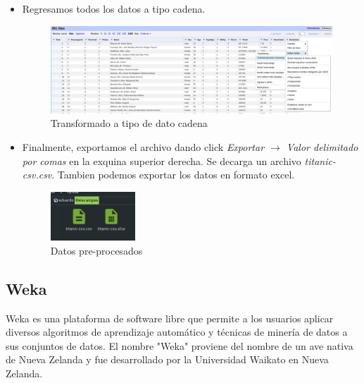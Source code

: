 \documentclass[12pt]{article}
\begin{document}
\begin{itemize}
                    \newpage
                    \item Regresamos todos los datos a tipo cadena.
                        \begin{figure}[!h]
                            \centering
                            \includegraphics[width=1\textwidth]{img/openrefine-23.png}
                            \caption{Transformado a tipo de dato cadena}
                        \end{figure}
                    
                    \item Finalmente, exportamos el archivo dando click \textit{Exportar $\rightarrow$ Valor delimitado por comas} en la exquina superior derecha. Se decarga un archivo \textit{titanic-csv.csv}. Tambien podemos exportar los datos en formato excel.
                        \begin{figure}[!h]
                            \centering
                            \includegraphics[width=0.3\textwidth]{img/openrefine-24.png}
                            \caption{Datos pre-procesados}
                        \end{figure}
                
                \end{itemize}
                

            \newpage
            \subsection{Weka}
                Weka es una plataforma de software libre que permite a los usuarios aplicar diversos algoritmos de aprendizaje automático y técnicas de minería de datos a sus conjuntos de datos. El nombre "Weka" proviene del nombre de un ave nativa de Nueva Zelanda y fue desarrollado por la Universidad Waikato en Nueva Zelanda.
                
\end{document}
